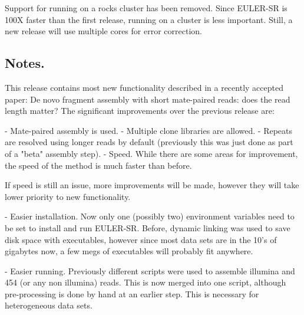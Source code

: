 \documentclass{article}[12pt]
\begin{document}
	Support for running on a rocks cluster has been removed.  Since
	EULER-SR is 100X faster than the first release, running on a cluster
	is less important.  Still, a new release will use multiple cores for
	error correction.


  \subsection{Notes.}

	This release contains most new functionality described in a recently
	accepted paper: De novo fragment assembly with short mate-paired
	reads: does the read length matter?  The significant improvements
	over the previous release are:

  - Mate-paired assembly is used.
     - Multiple clone libraries are allowed.
  - Repeats are resolved using longer reads by default (previously
     this was just done as part of a "beta" assembly step).
  - Speed.  While there are some areas for improvement, the speed of
     the method is much faster than before.

		 If speed is still an issue, more improvements will be made,
		 however they will take lower priority to new functionality.

  - Easier installation.  Now only one (possibly two) environment
    variables need to be set to install and run EULER-SR.  Before,
    dynamic linking was used to save disk space with executables,
    however since most data sets are in the 10's of gigabytes now, a
    few megs of executables will probably fit anywhere.

  - Easier running. Previously different scripts were used to assemble
    illumina and 454 (or any non illumina) reads.  This is now merged
    into one script, although pre-processing is done by hand at an
    earlier step.  This is necessary for heterogeneous data sets.


	
\end{document}
